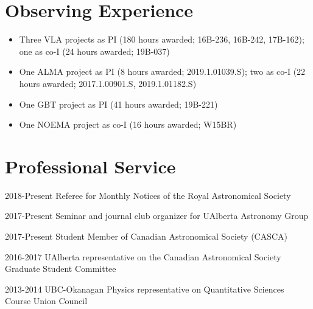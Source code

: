 \documentclass[letterpaper,11pt]{article}
\newlength{\mainindent} \setlength{\mainindent}{12pt}
\newlength{\contentindent} \setlength{\contentindent}{19ex}
\newenvironment{datelist}{
  \begingroup
  \raggedright
  \begin{description}[labelindent=\mainindent,leftmargin=\contentindent,
      style=sameline,font=\normalfont,topsep=0pt,partopsep=0pt,parsep=0pt,
      itemsep=4pt]
}{
  \end{description}
  \endgroup
}
\begin{document}


\section*{Observing Experience}
\begin{itemize}
\item Three VLA projects as PI (180 hours awarded; 16B-236, 16B-242, 17B-162); one as co-I (24 hours awarded; 19B-037)
\item One ALMA project as PI (8 hours awarded; 2019.1.01039.S); two as co-I (22 hours awarded; 2017.1.00901.S, 2019.1.01182.S)
\item One GBT project as PI (41 hours awarded; 19B-221)
\item One NOEMA project as co-I (16 hours awarded; W15BR)
\end{itemize}

\section*{Professional Service}
\begin{datelist}

\item[2018-Present] Referee for Monthly Notices of the Royal Astronomical Society
\item[2017-Present] Seminar and journal club organizer for UAlberta Astronomy Group
\item[2017-Present] Student Member of Canadian Astronomical Society (CASCA)
\item[2016-2017] UAlberta representative on the Canadian Astronomical Society Graduate Student Committee
\item[2013-2014] UBC-Okanagan Physics representative on Quantitative Sciences Course Union Council

\end{datelist}
\end{document}
